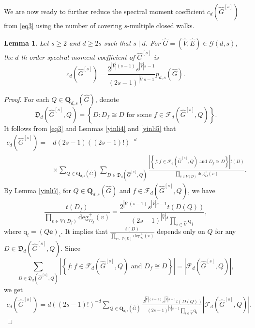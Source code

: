 \documentclass{article}
\newtheorem{lem}[thm]{Lemma}
\begin{document}
We are now ready to further reduce the spectral moment coefficient $c_{d}(\widehat{G}^{[s]})$ from \eqref{eq3} using the number of covering $s$-multiple closed walks.

\begin{lem}\label{yinli8}
Let $s \geq 2$ and $d \geq 2s$ such that $s \mid d$.
For $\widehat{G}=(\widehat{V},\widehat{E}) \in \mathcal{G}(d,s)$,
the $d$-th order spectral moment coefficient of $\widehat{G}^{[s]}$ is
$$c_{d}(\widehat{G}^{[s]})=\frac{2^{|\widehat{V}|(s-1)}s^{|\widehat{V}|s-1}}{(2s-1)^{|\widehat{V}|s-1}}p_{d,s}(\widehat{G}).$$
\end{lem}

\begin{proof}
For each $Q \in \mathbf{Q}_{d,s}(\widehat{G})$,
denote $$\mathfrak{D}_{d}(\widehat{G}^{[s]},Q)=\left\{ D : \mbox{$D_{f} \cong D$ for some $f \in \mathcal{F}_{d}(\widehat{G}^{[s]},Q)$} \right\}.$$
It follows from \eqref{eq3} and Lemmas \ref{yinli4} and \ref{yinli5} that
\begin{align*}
c_{d}(\widehat{G}^{[s]})=&d(2s-1)\left((2s-1)!\right)^{-d}\\
&\times\sum_{Q \in \mathbf{Q}_{d,s}(\widehat{G})}\sum_{D \in \mathfrak{D}_{d}(\widehat{G}^{[s]},Q)}\frac{\left|\left\{f:\mbox{$f \in \mathcal{F}_{d}(\widehat{G}^{[s]},Q)$ and $D_{f}\cong D$}\right\}\right|t(D)}{\prod_{v\in V(D)}\mathrm{deg}_{D}^{+}(v)}.
\end{align*}
By Lemma \ref{yinli7},
for $Q \in \mathbf{Q}_{d,s}(\widehat{G})$ and $f \in \mathcal{F}_{d}(\widehat{G}^{[s]},Q)$,
we have $$\frac{t(D_f)}{\prod_{v\in V(D_f)}\mathrm{deg}_{D_f}^{+}(v)}
=\frac{2^{|\widehat{V}|(s-1)}s^{|\widehat{V}|s-1}t(D(Q))}{(2s-1)^{|\widehat{V}|s}\prod_{i \in \widehat{V}}\mathrm{q}_{i}},$$
where $\mathrm{q}_{i}=(Q\mathbf{e})_i$.
It implies that $\frac{t(D)}{\prod_{v\in V(D)}\mathrm{deg}_{D}^{+}(v)}$ depends only on $Q$ for any $D \in \mathfrak{D}_{d}(\widehat{G}^{[s]},Q)$.
Since $$\sum_{D \in \mathfrak{D}_{d}(\widehat{G}^{[s]},Q)}\left|\left\{f:\mbox{$f\in\mathcal{F}_{d}(\widehat{G}^{[s]},Q)$ and $D_{f}\cong D$}\right\}\right|=\left|\mathcal{F}_{d}(\widehat{G}^{[s]},Q)\right|,$$
we get
\begin{align}\label{eq9}
c_{d}(\widehat{G}^{[s]})
=d\left((2s-1)!\right)^{-d}\sum_{Q \in \mathbf{Q}_{d,s}(\widehat{G})}\frac{2^{|\widehat{V}|(s-1)}s^{|\widehat{V}|s-1}t(D(Q))}{(2s-1)^{|\widehat{V}|s-1}\prod_{i \in \widehat{V}}\mathrm{q}_{i}}\left|\mathcal{F}_{d}(\widehat{G}^{[s]},Q)\right|.
\end{align}


\end{proof}
\end{document}
